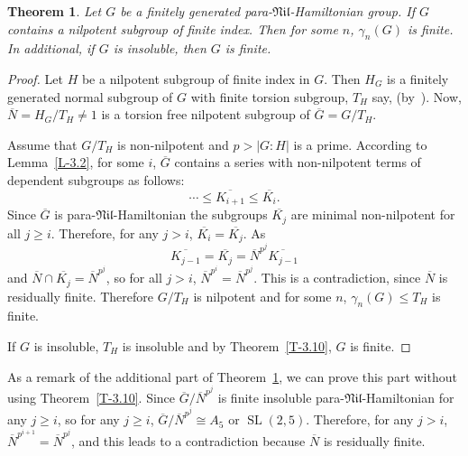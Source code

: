 \documentclass[11pt]{amsart}
\newtheorem{theorem}{Theorem}[section]
\DeclareMathOperator{\SL}{SL}
\newcommand{\sub}{\leqslant}
\newcommand{\nil}{\mathfrak{Nil}}
\begin{document}
\begin{theorem}\label{T-3.11}
Let $G$ be a finitely generated para-$\mathfrak{Nil}$-Hamiltonian group. If $G$ contains a nilpotent subgroup of finite index. Then for some $n$, $\gamma_n(G)$ is finite. In additional, if $G$ is insoluble, then $G$ is finite. 
\end{theorem}
\begin{proof}
Let $H$ be a nilpotent subgroup of finite index in $G$. Then $H_G$ is a finitely generated normal subgroup of $G$ with finite torsion subgroup, $T_H$ say, (by~\cite[2.49(ii)]{DKS}). Now, $\overline{N}=H_G/T_H\neq 1$ is a torsion free nilpotent subgroup of $\overline{G}=G/T_H$.

Assume that  $G/T_H$ is non-nilpotent and $p>|G: H|$ is a prime. According to Lemma~\ref{L-3.2}, for some $i$,  $\overline{G}$ contains a series with non-nilpotent terms of dependent subgroups as follows:
\[\cdots\sub\overline{ K_{i+1}}\sub \overline{K_i}.\] 
Since $\overline{G}$ is para-$\nil$-Hamiltonian the subgroups $\overline{K_j}$ are minimal non-nilpotent for all $j\geq i$. Therefore, for any $j>i$, $\overline{K_i}=\overline{K_j}$. As 
\[\overline{K_{j-1}}=\overline{K_j}=\overline{N}^{p^j}\overline{K_{j-1}}\] and $\overline{N}\cap\overline{K_j}=\overline{N}^{p^j}$, so for all $j> i$, $\overline{N}^{p^i}=\overline{N}^{p^j}$. This is a contradiction, since $\overline{N}$ is residually finite. Therefore $G/T_H$ is nilpotent and for some $n$, $\gamma_n(G)\sub T_H$ is finite.

If $G$ is insoluble, $T_H$ is insoluble and by Theorem~\ref{T-3.10}, $G$ is finite.
\end{proof}
As a remark of  the additional part of Theorem~\ref{T-3.11}, we can prove this part without using Theorem~\ref{T-3.10}. Since $\overline{G}/\overline{N}^{p^j}$ is finite insoluble para-$\nil$-Hamiltonian for any $j\geq i$, so for any $j\geq i$, $\overline{G}/\overline{N}^{p^j}\cong A_5$ or $\SL(2,5)$. Therefore, for any $j> i$, $\overline{N}^{p^{i+1}}=\overline{N}^{p^j}$, and this leads to a contradiction because $\overline{N}$ is residually finite.
\end{document}
